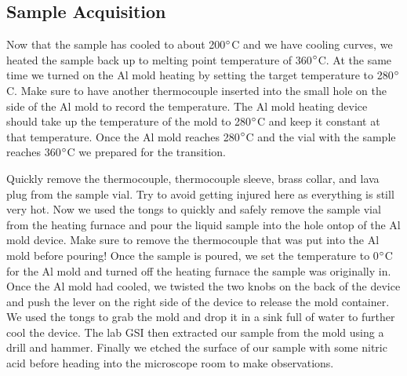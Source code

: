 \documentclass{article}
\begin{document}
\subsection{Sample Acquisition}
Now that the sample has cooled to about 200$\degree$C and we have cooling curves, we heated the sample back up to melting point temperature of 360$\degree$C. At the same time we turned on the Al mold heating by setting the target temperature to 280$\degree$C. Make sure to have another thermocouple inserted into the small hole on the side of the Al mold to record the temperature. The Al mold heating device should take up the temperature of the mold to 280$\degree$C and keep it constant at that temperature. Once the Al mold reaches 280$\degree$C and the vial with the sample reaches 360$\degree$C we prepared for the transition. 

Quickly remove the thermocouple, thermocouple sleeve, brass collar, and lava plug from the sample vial. Try to avoid getting injured here as everything is still very hot. Now we used the tongs to quickly and safely remove the sample vial from the heating furnace and pour the liquid sample into the hole ontop of the Al mold device. Make sure to remove the thermocouple that was put into the Al mold before pouring! Once the sample is poured, we set the temperature to 0$\degree$C for the Al mold and turned off the heating furnace the sample was originally in. Once the Al mold had cooled, we twisted the two knobs on the back of the device and push the lever on the right side of the device to release the mold container. We used the tongs to grab the mold and drop it in a sink full of water to further cool the device. The lab GSI then extracted our sample from the mold using a drill and hammer. Finally we etched the surface of our sample with some nitric acid before heading into the microscope room to make observations.

\end{document}
